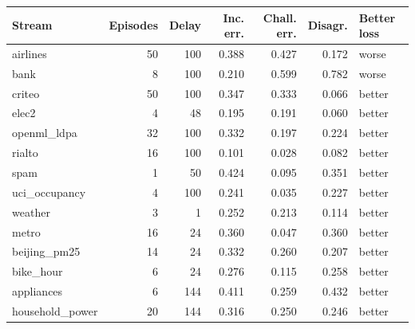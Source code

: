 \begin{tabular}{@{}l r r r r r l@{}}
\toprule
Stream & Episodes & Delay & Inc. err. & Chall. err. & Disagr. & Better loss \\
\midrule
airlines & 50 & 100 & 0.388 & 0.427 & 0.172 & worse \\
bank & 8 & 100 & 0.210 & 0.599 & 0.782 & worse \\
criteo & 50 & 100 & 0.347 & 0.333 & 0.066 & better \\
elec2 & 4 & 48 & 0.195 & 0.191 & 0.060 & better \\
openml\_ldpa & 32 & 100 & 0.332 & 0.197 & 0.224 & better \\
rialto & 16 & 100 & 0.101 & 0.028 & 0.082 & better \\
spam & 1 & 50 & 0.424 & 0.095 & 0.351 & better \\
uci\_occupancy & 4 & 100 & 0.241 & 0.035 & 0.227 & better \\
weather & 3 & 1 & 0.252 & 0.213 & 0.114 & better \\
\midrule
metro & 16 & 24 & 0.360 & 0.047 & 0.360 & better \\
beijing\_pm25 & 14 & 24 & 0.332 & 0.260 & 0.207 & better \\
bike\_hour & 6 & 24 & 0.276 & 0.115 & 0.258 & better \\
appliances & 6 & 144 & 0.411 & 0.259 & 0.432 & better \\
household\_power & 20 & 144 & 0.316 & 0.250 & 0.246 & better \\
\bottomrule
\end{tabular}

